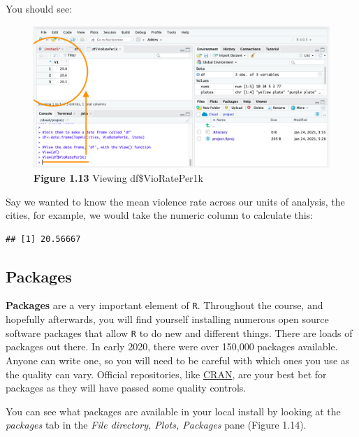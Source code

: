 \documentclass[
]{book}
\newenvironment{Shaded}{\begin{snugshade}}{\end{snugshade}}
\newcommand{\FunctionTok}[1]{\textcolor[rgb]{0.00,0.00,0.00}{#1}}
\newcommand{\NormalTok}[1]{#1}
\newcommand{\SpecialCharTok}[1]{\textcolor[rgb]{0.00,0.00,0.00}{#1}}
\begin{document}
You should see:

\begin{figure}
\centering
\includegraphics{Images/view_col_only.png}
\caption{\textbf{Figure 1.13} Viewing df\$VioRatePer1k}
\end{figure}

Say we wanted to know the mean violence rate across our units of analysis, the cities, for example, we would take the numeric column to calculate this:

\begin{Shaded}
\end{Shaded}

\begin{verbatim}
## [1] 20.56667
\end{verbatim}

\hypertarget{packages-1}{%
\subsection{Packages}\label{packages-1}}

\textbf{Packages} are a very important element of \texttt{R}. Throughout the course, and hopefully afterwards, you will find yourself installing numerous open source software packages that allow \texttt{R} to do new and different things. There are loads of packages out there. In early 2020, there were over 150,000 packages available. Anyone can write one, so you will need to be careful with which ones you use as the quality can vary. Official repositories, like \href{https://cran.r-project.org/}{CRAN}, are your best bet for packages as they will have passed some quality controls.

You can see what packages are available in your local install by looking at the \emph{packages} tab in the \emph{File directory, Plots, Packages} pane (Figure 1.14).
\end{document}

